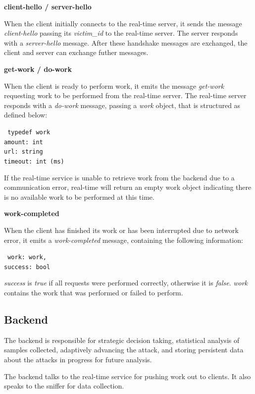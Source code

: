  \textbf{client-hello / server-hello}

When the client initially connects to the real-time server, it sends the message
\textit{client-hello} passing its \textit{victim\_id} to the real-time server.  The server
responds with a \textit{server-hello} message. After these handshake messages are
exchanged, the client and server can exchange futher messages.

 \textbf{get-work / do-work}

When the client is ready to perform work, it emits the message \textit{get-work}
requesting work to be performed from the real-time server. The real-time server
responds with a \textit{do-work} message, passing a \textit{work} object, that is
structured as defined below:

\texttt{
typedef work \\
  amount: int \\
  url: string \\
  timeout: int (ms) \\
}

If the real-time service is unable to retrieve work from the backend due to a
communication error, real-time will return an empty work object indicating
there is no available work to be performed at this time.

 \textbf{work-completed}

When the client has finished its work or has been interrupted due to network
error, it emits a \textit{work-completed} message, containing the following
information:

\texttt
{
  work: work,\\
  success: bool
}


\textit{success} is \textit{true} if all requests were performed correctly, otherwise it
is \textit{false}. \textit{work} contains the work that was performed or failed to perform.

\subsection{Backend}

The backend is responsible for strategic decision taking, statistical analysis
of samples collected, adaptively advancing the attack, and storing persistent
data about the attacks in progress for future analysis.

The backend talks to the real-time service for pushing work out to clients. It
also speaks to the sniffer for data collection.

